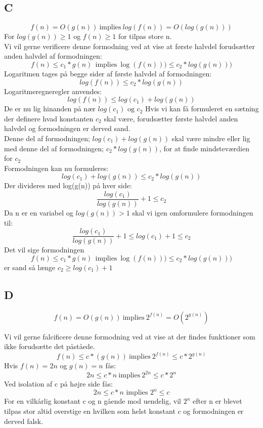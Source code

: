 \documentclass{article}
\begin{document}
	\subsection{C}
        \[ f(n) = O(g(n))  \: \text{implies} \: log(f(n)) = O(log(g(n))) \] For $ log(g(n)) \geq 1 $ og $ f(n) \geq 1 $ for tilpas store n.\\
            Vi vil gerne verificere denne formodning ved at vise at første halvdel forudsætter anden halvdel af formodningen:
        \[ f(n) \leq c_1*g(n) \ \: \text{implies} \: \log(f(n)) ) \leq c_2* log(g(n))) \]
            Logaritmen tages på begge sider af første halvdel af formodningen:
        \[ log(f(n)) \leq c_2*log(g(n)) \]
            Logaritmeregneregler anvendes:
        \[ log(f(n)) \leq log(c_1)+log(g(n)) \]
            De er nu lig hinanden på nær $ log(c_1) \text{ og } c_2 $ Hvis vi kan få formuleret en sætning der definere hvad konstanten $ c_2 $ skal være, forudsætter første halvdel anden halvdel og formodningen er derved sand.\\
            Denne del af formodningen; $ log(c_1)+log(g(n)) $ skal være mindre eller lig med denne del af formodningen; $ c_2*log(g(n)) $, for at finde mindsteværdien for $ c_2 $\\
            Formodningen kan nu formuleres:
        \[ log(c_1)+log(g(n)) \leq c_2*log(g(n)) \]
            Der divideres med log(g(n)) på hver side:
        \[ \frac{log(c_1)}{log(g(n))}+1 \leq c_2 \]
            Da n er en variabel og $ log(g(n)) > 1 $ skal vi igen omformulere formodningen til:
        \[ \frac{log(c_1)}{log(g(n))}+1 \leq log(c_1)+1 \leq c_2 \]
            Det vil sige formodningen 
        \[ f(n) \leq c_1*g(n) \ \: \text{implies} \: \log(f(n)) ) \leq c_2* log(g(n))) \]
            er sand så længe $ c_2 \geq log(c_1)+1$
				
	\subsection{D}
		\[ f(n)=O(g(n)) \: \text{implies} \: 2^{f(n)}=O(2^{g(n)}) \]
		
		    Vi vil gerne falcificere denne formodning ved at vise at der findes funktioner som ikke forudsætte det påståede.\\
		        \[ f(n) \leq c*(g(n)) \: \text{implies} \: 2^{f(n)} \leq c*2^{g(n)} \]
		    Hvis $ f(n) = 2n $ og $ g(n)=n $ fås:
		        \[ 2n \leq c*n \: \text{implies} \: 2^{2n} \leq c*2^n \]
		    Ved isolation af c på højre side fås:
                \[ 2n \leq c*n \text{ implies } 2^n \leq c \]
            For en vilkårlig konstant c og n gående mod uendelig, vil $ 2^{n} $ efter n er blevet tilpas stor altid overstige en hvilken som helst konstant $ c $ og formodningen er derved falsk.
		
\end{document}
